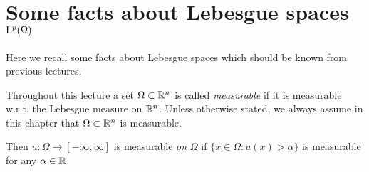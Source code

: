 \section{Some facts about Lebesgue spaces $\mathrm{L}^p(\Omega)$}

Here we recall some facts about Lebesgue spaces which should be known from previous lectures.

Throughout this lecture a set $\Omega \subset \mathbb{R}^n$ is called \emph{measurable} if it is measurable w.r.t. the Lebesgue measure on $\mathbb{R}^n$.
Unless otherwise stated, we always assume in this chapter that $\Omega \subset \mathbb{R}^n$ is measurable.

Then $u \colon \Omega \to [-\infty,\infty]$ is measurable \emph{on} $\Omega$ if $\{x \in \Omega \colon u(x) > \alpha\}$ is measurable for any $\alpha \in \mathbb{R}$.

